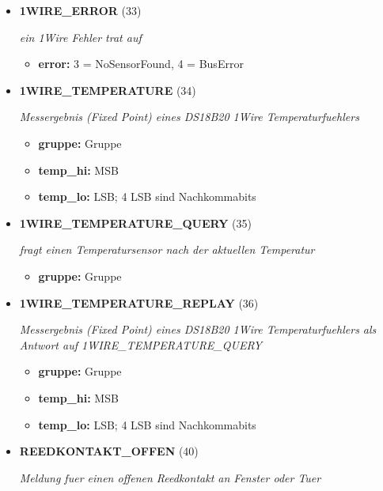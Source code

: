 \begin{itemize}
\item \textbf{1WIRE\_ERROR} (33)

\textit{ein 1Wire Fehler trat auf}

\small
\begin{itemize}
		
\item \textbf{error:} 3 = NoSensorFound, 4 = BusError
\end{itemize}
\normalsize
	
\item \textbf{1WIRE\_TEMPERATURE} (34)

\textit{Messergebnis (Fixed Point) eines DS18B20 1Wire Temperaturfuehlers}

\small
\begin{itemize}
		
\item \textbf{gruppe:} Gruppe
\item \textbf{temp\_hi:} MSB
\item \textbf{temp\_lo:} LSB; 4 LSB sind Nachkommabits
\end{itemize}
\normalsize
	
\item \textbf{1WIRE\_TEMPERATURE\_QUERY} (35)

\textit{fragt einen Temperatursensor nach der aktuellen Temperatur}

\small
\begin{itemize}
		
\item \textbf{gruppe:} Gruppe
\end{itemize}
\normalsize
	
\item \textbf{1WIRE\_TEMPERATURE\_REPLAY} (36)

\textit{Messergebnis (Fixed Point) eines DS18B20 1Wire Temperaturfuehlers als Antwort auf 1WIRE\_TEMPERATURE\_QUERY}

\small
\begin{itemize}
		
\item \textbf{gruppe:} Gruppe
\item \textbf{temp\_hi:} MSB
\item \textbf{temp\_lo:} LSB; 4 LSB sind Nachkommabits
\end{itemize}
\normalsize
	
\item \textbf{REEDKONTAKT\_OFFEN} (40)

\textit{Meldung fuer einen offenen Reedkontakt an Fenster oder Tuer}


\end{itemize}
